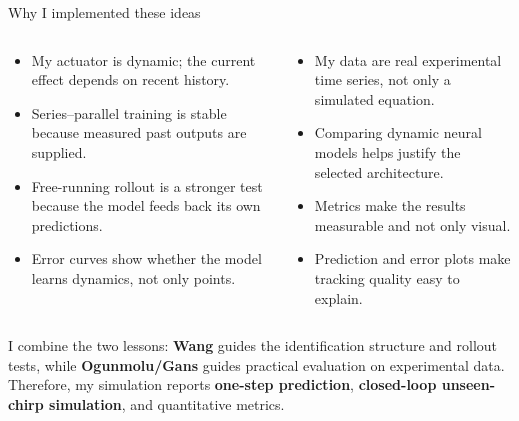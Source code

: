 \documentclass[aspectratio=169,10pt]{beamer}
\newcommand{\kw}[1]{\textcolor{Accent}{\textbf{#1}}}
\begin{document}
\begin{frame}{Why I implemented these ideas}
\scriptsize
\begin{columns}[T,onlytextwidth]

\begin{column}{0.485\textwidth}
\begin{tcolorbox}[
enhanced,
colback=LightGray,
colframe=DeepBlue,
colbacktitle=DeepBlue,
coltitle=white,
title=\textbf{Why Wang's ideas are useful},
fonttitle=\small\bfseries,
boxrule=0.8pt,
arc=2mm,
left=2mm,right=2mm,top=1.5mm,bottom=1.5mm,
height=0.52\textheight
]
\begin{itemize}\itemsep4pt
\item My actuator is dynamic; the current effect depends on recent history.
\item Series--parallel training is stable because measured past outputs are supplied.
\item Free-running rollout is a stronger test because the model feeds back its own predictions.
\item Error curves show whether the model learns dynamics, not only points.
\end{itemize}
\end{tcolorbox}
\end{column}

\begin{column}{0.485\textwidth}
\begin{tcolorbox}[
enhanced,
colback=LightGray,
colframe=SoftBlue,
colbacktitle=SoftBlue,
coltitle=white,
title=\textbf{Why Ogunmolu/Gans's ideas are useful},
fonttitle=\small\bfseries,
boxrule=0.8pt,
arc=2mm,
left=2mm,right=2mm,top=1.5mm,bottom=1.5mm,
height=0.52\textheight
]
\begin{itemize}\itemsep4pt
\item My data are real experimental time series, not only a simulated equation.
\item Comparing dynamic neural models helps justify the selected architecture.
\item Metrics make the results measurable and not only visual.
\item Prediction and error plots make tracking quality easy to explain.
\end{itemize}
\end{tcolorbox}
\end{column}

\end{columns}

\vspace{0.10cm}
\begin{tcolorbox}[
enhanced,
colback=LightGray,
colframe=Accent,
colbacktitle=Accent,
coltitle=white,
title=\textbf{How this guides my simulation},
fonttitle=\small\bfseries,
boxrule=0.8pt,
arc=2mm,
left=2mm,right=2mm,top=1.4mm,bottom=1.4mm,
height=0.22\textheight
]
I combine the two lessons: \textbf{Wang} guides the identification structure and rollout tests, while \textbf{Ogunmolu/Gans} guides practical evaluation on experimental data. Therefore, my simulation reports \kw{one-step prediction}, \kw{closed-loop unseen-chirp simulation}, and quantitative metrics.


\end{tcolorbox}
\end{frame}
\end{document}

